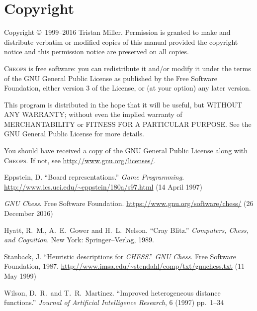 \documentclass[a4paper]{article}
\begin{document}
\section{Copyright}

Copyright \copyright\ 1999--2016 Tristan Miller.  Permission is
granted to make and distribute verbatim or modified copies of this
manual provided the copyright notice and this permission notice are
preserved on all copies.

\textsc{Cheops} is free software: you can redistribute it and\slash or
modify it under the terms of the GNU General Public License as
published by the Free Software Foundation, either version 3 of the
License, or (at your option) any later version.

This program is distributed in the hope that it will be useful, but
WITHOUT ANY WARRANTY; without even the implied warranty of
MERCHANTABILITY or FITNESS FOR A PARTICULAR PURPOSE.  See the GNU
General Public License for more details.

You should have received a copy of the GNU General Public License
along with \textsc{Cheops}.  If not, see
\url{http://www.gnu.org/licenses/}.

\begin{thebibliography}{99}

 Eppstein, D. ``Board representations.''  \emph{Game
    Programming}.
  \url{http://www.ics.uci.edu/~eppstein/180a/s97.html} (14 April 1997)

 \emph{GNU Chess}.  Free Software Foundation.
  \url{https://www.gnu.org/software/chess/} (26 December 2016)

 Hyatt, R.~M., A.~E.~Gower and H.~L.~Nelson.
  ``Cray Blitz.'' \emph{Computers, Chess, and Cognition}.  New York:
  Springer--Verlag, 1989.

 Stanback, J.  ``Heuristic descriptions for
  \emph{CHESS}.''  \emph{GNU Chess}.  Free Software Foundation, 1987.
  \url{http://www.imsa.edu/~stendahl/comp/txt/gnuchess.txt} (11 May 1999)

 Wilson, D.~R.~and T.~R.~Martinez. ``Improved
  heterogeneous distance functions.''  \emph{Journal of Artificial
    Intelligence Research}, 6 (1997) pp.~1--34

\end{thebibliography}
\end{document}
